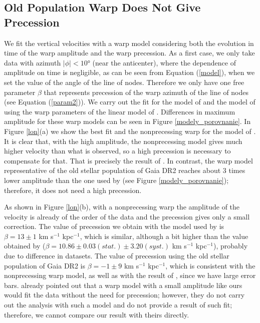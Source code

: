 \documentclass[twocolumn]{aastex63}
\begin{document}
\subsection{Old Population Warp Does Not Give Precession}
We fit the vertical velocities with a warp model considering both the evolution in time of the warp amplitude and the warp precession. As a first case, we only take data with azimuth $\lvert \phi \rvert<\ang{10}$ (near the anticenter), where the dependence of amplitude on time is negligible, as can be seen from Equation (\ref{model}), when we set the value of the angle of the line of nodes. Therefore we only have one free parameter $\beta$ that represents precession of the warp azimuth of the line of nodes (see Equation (\ref{param2})). We carry out the fit for the model of \cite{zofi} and the model of  using the warp parameters of the linear model of \cite{chen}. Differences in maximum amplitude for these warp models can be seen in Figure \ref{modely_porovnanie}. In Figure \ref{lon}(a) we show the best fit and the nonprecessing warp for the model of . It is clear that, with the high amplitude, the nonprecessing model gives much higher velocity than what is observed, so a high precession is necessary to compensate for that. That is precisely the result of . In contrast, the warp model representative of the old stellar population of Gaia DR2 \citep{zofi} reaches about 3 times lower amplitude than the one used by  (see Figure \ref{modely_porovnanie}); therefore, it does not need a high precession.
 
As shown in Figure \ref{lon}(b), with a nonprecessing warp the amplitude of the velocity is already of the order of the data and the precession gives only a small correction. The value of precession we obtain with the model used by  is $\beta=13 \pm 1$ km s$^{-1}$ kpc$^{-1}$, which is similar, although a bit higher than the value obtained by  ($\beta=10.86 \pm 0.03 (stat.) \pm 3.20 (syst.)$ km s$^{-1}$ kpc$^{-1}$), probably due to difference in datasets. The value of precession using the old stellar population of Gaia DR2 is $\beta=-1 \pm 9$ km s$^{-1}$ kpc$^{-1}$, which is consistent with the nonprecessing warp model, as well as with the result of , since we have large error bars.  already pointed out that a warp model with a small amplitude like ours would fit the data without the need for precession; however, they do not carry out the analysis with such a model and do not provide a result of such fit; therefore, we cannot compare our result with theirs directly.
\end{document}
